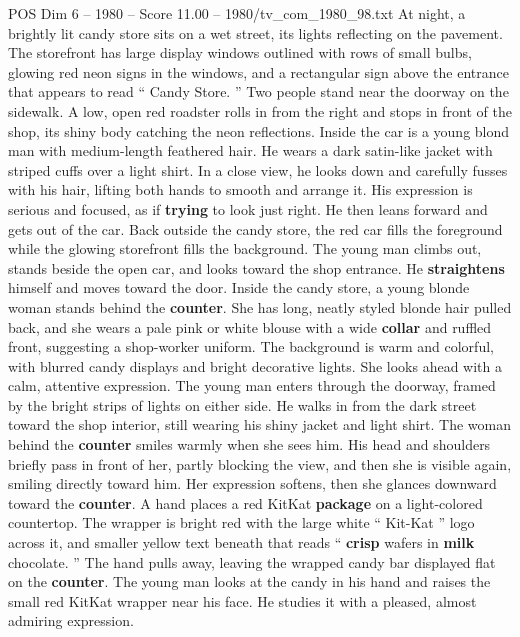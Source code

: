 \begin{textsample}{POS Dim 6 – 1980 – Score 11.00 – 1980/tv\_com\_1980\_98.txt}  \label{ex:f6_pos_037}
At night, a brightly lit candy store sits on a wet street, its lights reflecting on the pavement.
The storefront has large display windows outlined with rows of small bulbs, glowing red neon signs in the windows, and a rectangular sign above the entrance that appears to read “ Candy Store. ” Two people stand near the doorway on the sidewalk.
A low, open red roadster rolls in from the right and stops in front of the shop, its shiny body catching the neon reflections.
Inside the car is a young blond man with medium-length feathered hair.
He wears a dark satin-like jacket with striped cuffs over a light shirt.
In a close view, he looks down and carefully fusses with his hair, lifting both hands to smooth and arrange it.
His expression is serious and focused, as if \textbf{trying} to look just right.
He then leans forward and gets out of the car.
Back outside the candy store, the red car fills the foreground while the glowing storefront fills the background.
The young man climbs out, stands beside the open car, and looks toward the shop entrance.
He \textbf{straightens} himself and moves toward the door.
Inside the candy store, a young blonde woman stands behind the \textbf{counter}.
She has long, neatly styled blonde hair pulled back, and she wears a pale pink or white blouse with a wide \textbf{collar} and ruffled front, suggesting a shop-worker uniform.
The background is warm and colorful, with blurred candy displays and bright decorative lights.
She looks ahead with a calm, attentive expression.
The young man enters through the doorway, framed by the bright strips of lights on either side.
He walks in from the dark street toward the shop interior, still wearing his shiny jacket and light shirt.
The woman behind the \textbf{counter} smiles warmly when she sees him.
His head and shoulders briefly pass in front of her, partly blocking the view, and then she is visible again, smiling directly toward him.
Her expression softens, then she glances downward toward the \textbf{counter}.
A hand places a red KitKat \textbf{package} on a light-colored countertop.
The wrapper is bright red with the large white “ Kit-Kat ” logo across it, and smaller yellow text beneath that reads “ \textbf{crisp} wafers in \textbf{milk} chocolate. ” The hand pulls away, leaving the wrapped candy bar displayed flat on the \textbf{counter}.
The young man looks at the candy in his hand and raises the small red KitKat wrapper near his face.
He studies it with a pleased, almost admiring expression.

\end{textsample}
